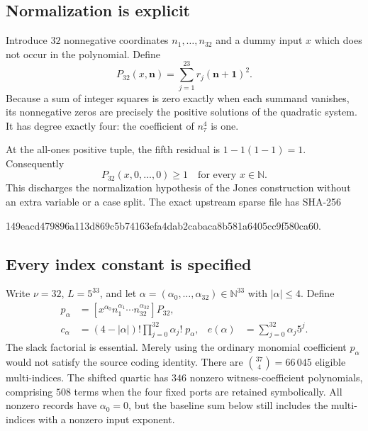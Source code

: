\documentclass[11pt,a4paper]{article}
\theoremstyle{remark}
\newcommand{\NN}{\mathbb N}
\begin{document}
\subsection{Normalization is explicit}

Introduce $32$ nonnegative coordinates $n_1,\ldots,n_{32}$ and a dummy
input $x$ which does not occur in the polynomial.  Define
\begin{equation}
 P_{32}(x,\mathbf n)=\sum_{j=1}^{23}r_j(\mathbf n+\mathbf 1)^2.
 \label{eq:quartic}
\end{equation}
Because a sum of integer squares is zero exactly when each summand
vanishes, its nonnegative zeros are precisely the positive solutions
of the quadratic system.  It has degree exactly four: the coefficient
of $n_\tau^4$ is one.

At the all-ones positive tuple, the fifth residual is
$1-1(1-1)=1$.  Consequently
\[
 P_{32}(x,0,\ldots,0)\ge1
 \quad\text{for every }x\in\NN.
\]
This discharges the normalization hypothesis of the Jones construction
without an extra variable or a case split.  The exact upstream sparse
file has SHA-256
\begin{center}\small\ttfamily
149eacd479896a113d869c5b74163efa4dab2cabaca8b581a6405cc9f580ca60.
\end{center}

\subsection{Every index constant is specified}

Write $\nu=32$, $L=5^{33}$, and let
$\alpha=(\alpha_0,\ldots,\alpha_{32})\in\NN^{33}$ with
$|\alpha|\le4$.  Define
\begin{align*}
 p_\alpha&=[x^{\alpha_0}n_1^{\alpha_1}\cdots n_{32}^{\alpha_{32}}]P_{32},\\
 c_\alpha&=(4-|\alpha|)!\prod_{j=0}^{32}\alpha_j!\;p_\alpha,
 &e(\alpha)&=\sum_{j=0}^{32}\alpha_j5^j.
\end{align*}
The slack factorial is essential.  Merely using the ordinary monomial
coefficient $p_\alpha$ would not satisfy the source coding identity.
There are $\binom{37}{4}=66\,045$ eligible multi-indices.  The shifted
quartic has $346$ nonzero witness-coefficient polynomials, comprising
$508$ terms when the four fixed ports are retained symbolically.
All nonzero records have $\alpha_0=0$, but the baseline sum below still
includes the multi-indices with a nonzero input exponent.
\end{document}
